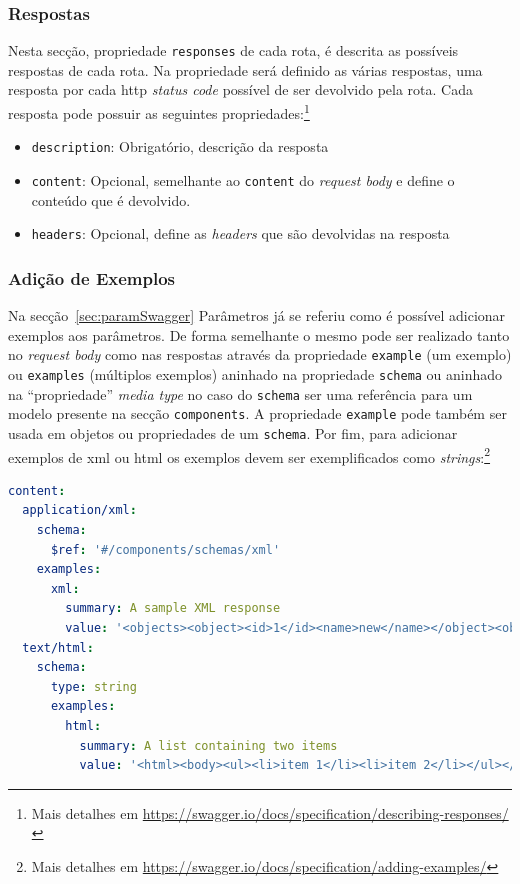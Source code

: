 \subsubsection{Respostas}
Nesta secção, propriedade \texttt{responses} de cada rota, é descrita as possíveis respostas de cada rota. Na propriedade será definido as várias respostas, uma resposta por cada \acrshort{http} \textit{status code} possível de ser devolvido pela rota. Cada resposta pode possuir as seguintes propriedades:\footnote{Mais detalhes em \url{https://swagger.io/docs/specification/describing-responses/}}
\begin{itemize}
    \item \texttt{description}: Obrigatório, descrição da resposta
    \item \texttt{content}: Opcional, semelhante ao \texttt{content} do \textit{request body} e define o conteúdo que é devolvido.
    \item \texttt{headers}: Opcional, define as \textit{headers} que são devolvidas na resposta
\end{itemize}

\subsubsection{Adição de Exemplos}
Na secção~\ref{sec:paramSwagger} Parâmetros já se referiu como é possível adicionar exemplos aos parâmetros. De forma semelhante o mesmo pode ser realizado tanto no \textit{request body} como nas respostas através da propriedade \texttt{example} (um exemplo) ou \texttt{examples} (múltiplos exemplos) aninhado na propriedade \texttt{schema} ou aninhado na ``propriedade'' \textit{media type} no caso do \texttt{schema} ser uma referência para um modelo presente na secção \texttt{components}. A propriedade \texttt{example} pode também ser usada em objetos ou propriedades de um \texttt{schema}. Por fim, para adicionar exemplos de \acrshort{xml} ou \acrshort{html} os exemplos devem ser exemplificados como \textit{strings}:\footnote{Mais detalhes em \url{https://swagger.io/docs/specification/adding-examples/}}
\begin{lstlisting}[language=yaml, caption=Exemplo de adição de exemplos para \acrshort{xml} e \acrshort{html} na especificação \textit{OpenAPI}]
content:
  application/xml:
    schema:
      $ref: '#/components/schemas/xml'
    examples:
      xml:
        summary: A sample XML response
        value: '<objects><object><id>1</id><name>new</name></object><object><id>2</id></object></objects>'
  text/html:
    schema:
      type: string
      examples:
        html:
          summary: A list containing two items
          value: '<html><body><ul><li>item 1</li><li>item 2</li></ul></body></html>'
\end{lstlisting}

